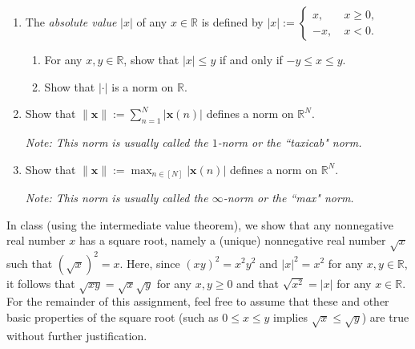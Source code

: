 \documentclass[12 pt,letterpaper]{article}
\newcommand{\bbR}{\mathbb{R}}
\newcommand{\bfx}{\boldsymbol{x}}
\newcommand{\abs}[1]{|{#1}|}
\newcommand{\norm}[1]{\|{#1}\|}
\newcommand{\alphii}{\renewcommand{\labelenumii}{(\alph{enumii})}}
\begin{document}
\begin{enumerate}
\item
The \textit{absolute value} $\abs{x}$ of any $x\in\bbR$ is defined by
$\abs{x}:=\left\{\begin{array}{rl}x,&\ x\geq 0,\\-x,&\ x<0.\end{array}\right.$

\begin{enumerate}
\alphii

\item
For any $x,y\in\bbR$,
show that $\abs{x}\leq y$ if and only if $-y\leq x\leq y$.

\item
Show that $\abs{\cdot}$ is a norm on $\bbR$.

\end{enumerate}

\item
Show that $\displaystyle\norm{\bfx}:=\sum_{n=1}^{N}\abs{\bfx(n)}$ defines a norm on $\bbR^N$.

\textit{Note: This norm is usually called the $1$-norm or the ``taxicab" norm.}

\item
Show that $\displaystyle\norm{\bfx}:=\max_{n\in[N]}\abs{\bfx(n)}$ defines a norm on $\bbR^N$.

\textit{Note: This norm is usually called the $\infty$-norm or the ``max" norm.}

\end{enumerate}

\newpage

In class (using the intermediate value theorem),
we show that any nonnegative real number $x$ has a square root,
namely a (unique) nonnegative real number $\sqrt{x}$ such that $(\sqrt{x})^2=x$.
Here, since $(xy)^2=x^2y^2$ and $\abs{x}^2=x^2$ for any $x,y\in\bbR$,
it follows that $\sqrt{xy}=\sqrt{x}\sqrt{y}$ for any $x,y\geq0$ and that $\sqrt{x^2}=\abs{x}$ for any $x\in\bbR$.
For the remainder of this assignment,
feel free to assume that these and other basic properties of the square root (such as $0\leq x\leq y$ implies $\sqrt{x}\leq \sqrt{y}$) are true without further justification.
\end{document}
